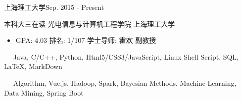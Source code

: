 \documentclass{sorahjy_cv}
\begin{document}
\pagestyle{empty}


\begin{cvHeader}
\end{cvHeader}

%
%

\begin{sectionContentSimple}{上海理工大学}{Sep. 2015 - Present}
	\item 本科大三在读 光电信息与计算机工程学院 上海理工大学
	\begin{itemize}
		\item GPA: 4.03 \quad 排名: 1/107 \quad 学士导师: 霍欢 副教授
	\end{itemize}
	
\end{sectionContentSimple}

%
%






%
%

\begin{description}{}
	\item{\ \ } Java, C/C++, Python, Html5/CSS3/JavaScript, Linux Shell Script, SQL, \LaTeX, MarkDown
	\item{\ \ } Algorithm, Vue.js, Hadoop, Spark, Bayesian Methods, Machine Learning, Data Mining, Spring Boot
\end{description}
\end{document}
